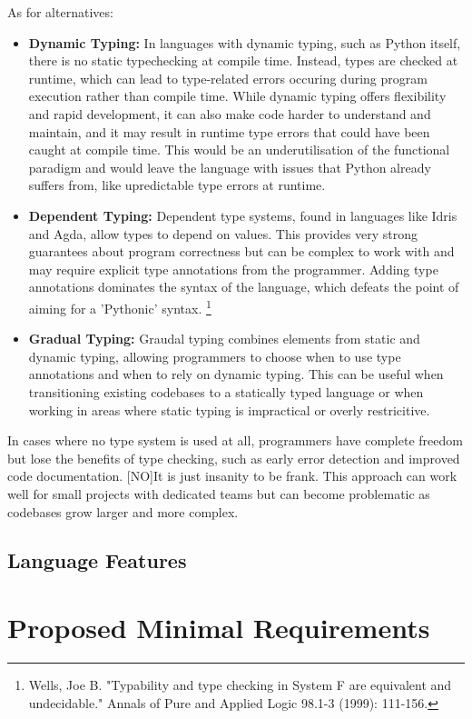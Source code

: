 \documentclass{l4proj}
\begin{document}
As for alternatives:

\begin{itemize}
    \item \textbf{Dynamic Typing:} In languages with dynamic typing, such as Python itself, there is no static typechecking at compile time.
    Instead, types are checked at runtime, which can lead to type-related errors occuring during program execution rather than compile time. 
    While dynamic typing offers flexibility and rapid development, it can also make code harder to understand and maintain, and it may result in runtime type errors that could have been caught at compile time.
    This would be an underutilisation of the functional paradigm and would leave the language with issues that Python already suffers from, like upredictable type errors at runtime.
    \item \textbf{Dependent Typing:} Dependent type systems, found in languages like Idris and Agda, allow types to depend on values.
    This provides very strong guarantees about program correctness but can be complex to work with and may require explicit type annotations from the programmer.
    Adding type annotations dominates the syntax of the language, which defeats the point of aiming for a 'Pythonic' syntax. \footnote{Wells, Joe B. "Typability and type checking in System F are equivalent and undecidable." Annals of Pure and Applied Logic 98.1-3 (1999): 111-156.}
    \item \textbf{Gradual Typing:} Graudal typing combines elements from static and dynamic typing, allowing programmers to choose when to use type annotations and when to rely on dynamic typing.
    This can be useful when transitioning existing codebases to a statically typed language or when working in areas where static typing is impractical or overly restricitive.
\end{itemize}

In cases where no type system is used at all, programmers have complete freedom but lose the benefits of type checking, such as early error detection and improved code documentation.
[NO]It is just insanity to be frank.
This approach can work well for small projects with dedicated teams but can become problematic as codebases grow larger and more complex.

\subsection{Language Features}

\section{Proposed Minimal Requirements}
\end{document}
